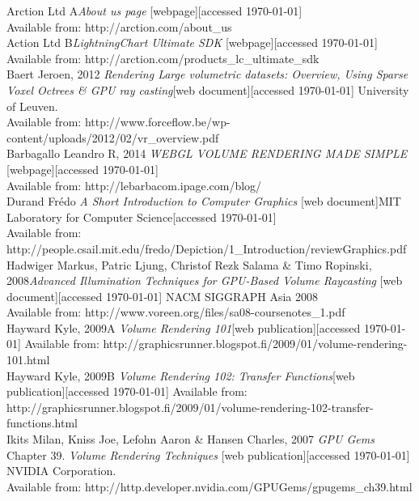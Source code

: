 \documentclass[twoside, english, 11pt]{report}
\begin{document}
\small Arction Ltd A\textit{About us page} [webpage][accessed \today] \\
Available from: http://arction.com/about\_us\\

\small Action Ltd B\textit{LightningChart Ultimate SDK} [webpage][accessed \today] \\
Available from: http://arction.com/products\_lc\_ultimate\_sdk\\

\small Baert Jeroen, 2012 \textit{Rendering Large volumetric datasets: Overview, Using Sparse Voxel Octrees \& GPU ray casting}[web document][accessed \today] University of Leuven.\\
Available from: http://www.forceflow.be/wp-content/uploads/2012/02/vr\_overview.pdf\\

\small Barbagallo Leandro R, 2014 \textit{WEBGL VOLUME RENDERING MADE SIMPLE} [webpage][accessed \today]\\ 
Available from: http://lebarbacom.ipage.com/blog/\\

\small Durand Frédo \textit{A Short Introduction to Computer Graphics} [web document]MIT Laboratory for Computer Science[accessed \today] \\
Available from: http://people.csail.mit.edu/fredo/Depiction/1\_Introduction/reviewGraphics.pdf\\

\small Hadwiger Markus, Patric Ljung, Christof Rezk Salama \& Timo Ropinski, 2008\textit{Advanced Illumination Techniques for GPU-Based Volume Raycasting} [web document][accessed \today] NACM SIGGRAPH Asia 2008 \\
Available from: http://www.voreen.org/files/sa08-coursenotes\_1.pdf\\

\small Hayward Kyle, 2009A \textit{Volume Rendering 101}[web publication][accessed \today]
Available from: http://graphicsrunner.blogspot.fi/2009/01/volume-rendering-101.html\\

\small Hayward Kyle, 2009B \textit{Volume Rendering 102: Transfer Functions}[web publication][accessed \today]
Available from: http://graphicsrunner.blogspot.fi/2009/01/volume-rendering-102-transfer-functions.html\\

\small Ikits Milan, Kniss Joe, Lefohn Aaron \& Hansen Charles, 2007 \textit{GPU Gems} Chapter 39. \textit{Volume Rendering Techniques} [web publication][accessed \today] NVIDIA Corporation.\\
Available from: http://http.developer.nvidia.com/GPUGems/gpugems\_ch39.html\\
\end{document}
